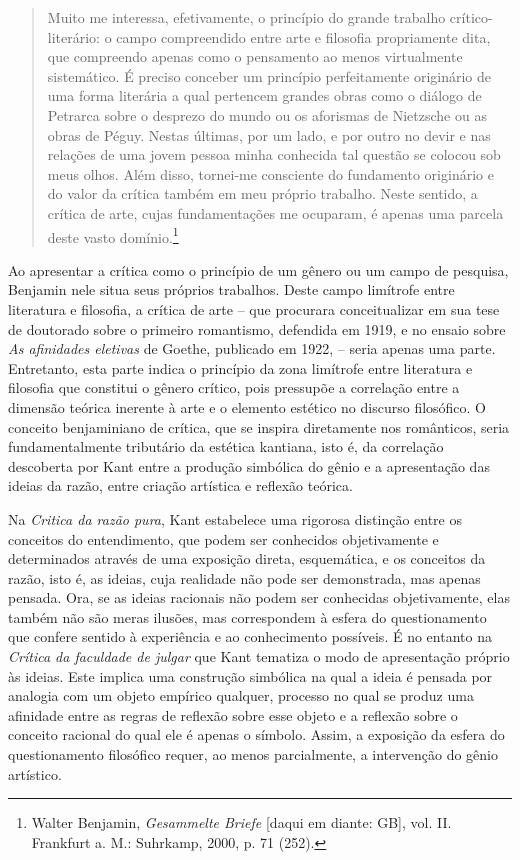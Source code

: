 \begin{quote}
Muito me interessa, efetivamente, o princípio do grande trabalho
crítico-literário: o campo compreendido entre arte e filosofia
propriamente dita, que compreendo apenas como o pensamento ao menos
virtualmente sistemático. É preciso conceber um princípio perfeitamente
originário de uma forma literária a qual pertencem grandes obras como o
diálogo de Petrarca sobre o desprezo do mundo ou os aforismas de
Nietzsche ou as obras de Péguy. Nestas últimas, por um lado, e por outro
no devir e nas relações de uma jovem pessoa minha conhecida tal questão
se colocou sob meus olhos. Além disso, tornei-me consciente do
fundamento originário e do valor da crítica também em meu próprio
trabalho. Neste sentido, a crítica de arte, cujas fundamentações me
ocuparam, é apenas uma parcela deste vasto domínio.\footnote{Walter
  Benjamin, \emph{Gesammelte Briefe} {[}daqui em diante: GB{]}, vol. II.
  Frankfurt a. M.: Suhrkamp, 2000, p. 71 (252).}
\end{quote}

Ao apresentar a crítica como o princípio de um gênero ou um campo de
pesquisa, Benjamin nele situa seus próprios trabalhos. Deste campo
limítrofe entre literatura e filosofia, a crítica de arte -- que
procurara conceitualizar em sua tese de doutorado sobre o primeiro
romantismo, defendida em 1919, e no ensaio sobre \emph{As afinidades
eletivas} de Goethe, publicado em 1922, -- seria apenas uma parte.
Entretanto, esta parte indica o princípio da zona limítrofe entre
literatura e filosofia que constitui o gênero crítico, pois pressupõe a
correlação entre a dimensão teórica inerente à arte e o elemento
estético no discurso filosófico. O conceito benjaminiano de crítica, que
se inspira diretamente nos românticos, seria fundamentalmente tributário
da estética kantiana, isto é, da correlação descoberta por Kant entre a
produção simbólica do gênio e a apresentação das ideias da razão, entre
criação artística e reflexão teórica.

Na \emph{Critica da razão pura}, Kant estabelece uma rigorosa distinção
entre os conceitos do entendimento, que podem ser conhecidos
objetivamente e determinados através de uma exposição direta,
esquemática, e os conceitos da razão, isto é, as ideias, cuja realidade
não pode ser demonstrada, mas apenas pensada. Ora, se as ideias
racionais não podem ser conhecidas objetivamente, elas também não são
meras ilusões, mas correspondem à esfera do questionamento que confere
sentido à experiência e ao conhecimento possíveis. É no entanto na
\emph{Crítica da faculdade de julgar} que Kant tematiza o modo de
apresentação próprio às ideias. Este implica uma construção simbólica na
qual a ideia é pensada por analogia com um objeto empírico qualquer,
processo no qual se produz uma afinidade entre as regras de reflexão
sobre esse objeto e a reflexão sobre o conceito racional do qual ele é
apenas o símbolo. Assim, a exposição da esfera do questionamento
filosófico requer, ao menos parcialmente, a intervenção do gênio
artístico.


